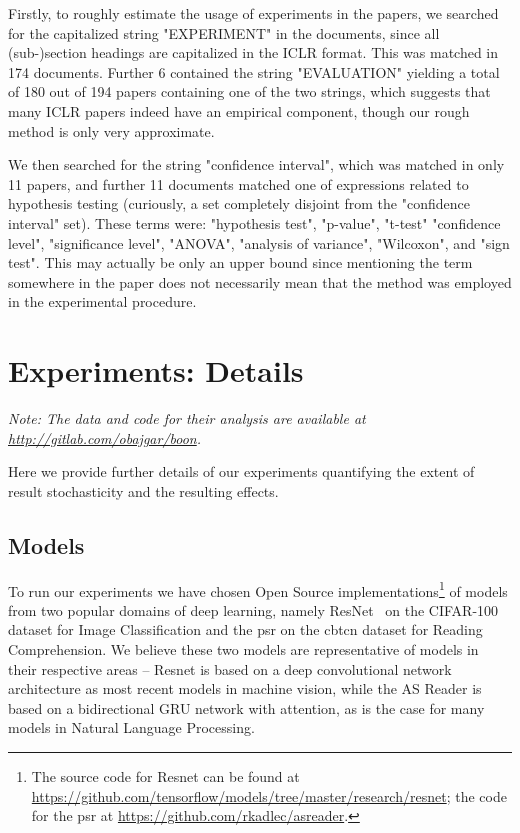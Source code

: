 \documentclass{article}
\newcommand{\asr}{\gls{psr}\xspace}
\newcommand{\cbtcn}{\gls{cbtcn}\xspace}
\begin{document}
\begin{appendices}
Firstly, to roughly estimate the usage of experiments in the papers, we searched for the capitalized string "EXPERIMENT" in the documents, since all (sub-)section headings are capitalized in the ICLR format. This was matched in 174 documents. Further 6 contained the string "EVALUATION" yielding a total of 180 out of 194 papers containing one of the two strings, which suggests that many ICLR papers indeed have an empirical component, though our rough method is only very approximate.

We then searched for the string "confidence interval", which was matched in only 11 papers, and further 11 documents matched one of expressions related to hypothesis testing (curiously, a set completely disjoint from the "confidence interval" set). These terms were: "hypothesis test", "p-value", "t-test" "confidence level", "significance level", "ANOVA", "analysis of variance", "Wilcoxon", and "sign test". This may actually be only an upper bound since mentioning the term somewhere in the paper does not necessarily mean that the method was employed in the experimental procedure.



\section{Experiments: Details}
\label{app:experiments}

{\it Note: The data and code for their analysis are available at \url{http://gitlab.com/obajgar/boon}.}

Here we provide further details of our experiments quantifying the extent of result stochasticity and the resulting effects. 

\subsection{Models}

To run our experiments we have chosen Open Source implementations\footnote{The source code for Resnet can be found at \url{https://github.com/tensorflow/models/tree/master/research/resnet}; the code for the \asr at \url{https://github.com/rkadlec/asreader}.} of models from two popular domains of deep learning, namely ResNet~\citep{he2016deep} on the CIFAR-100 dataset \citep{krizhevsky2009learning} for Image Classification and the \asr \citep{Kadlec2016} on the \cbtcn dataset \citep{hill2015goldilocks} for Reading Comprehension. We believe these two models are representative of models in their respective areas -- Resnet is based on a deep convolutional network architecture as most recent models in machine vision, while the AS Reader is based on a bidirectional GRU network with attention, as is the case for many models in Natural Language Processing. 



\end{appendices}
\end{document}
